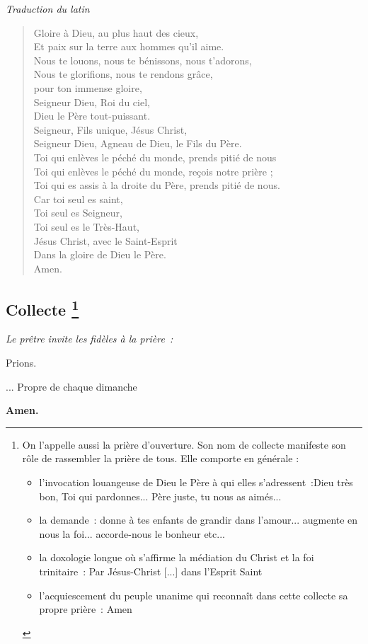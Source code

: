 \emph{Traduction du latin}
\begin{verse}
Gloire à Dieu, au plus haut des cieux, \\
Et paix sur la terre aux hommes qu'il aime.\\
Nous te louons, nous te bénissons, nous t'adorons,\\
Nous te glorifions, nous te rendons grâce,\\
pour ton immense gloire,\\
Seigneur Dieu, Roi du ciel,\\
Dieu le Père tout-puissant.\\
Seigneur, Fils unique, Jésus Christ,\\
Seigneur Dieu, Agneau de Dieu, le Fils du Père.\\
Toi qui enlèves le péché du monde, prends pitié de nous\\
Toi qui enlèves le péché du monde, reçois notre prière ;\\
Toi qui es assis à la droite du Père, prends pitié de nous.\\
Car toi seul es saint,\\
Toi seul es Seigneur,\\
Toi seul es le Très-Haut,\\
Jésus Christ, avec le Saint-Esprit\\
Dans la gloire de Dieu le Père. \\
Amen.\\
\end{verse}



\subsection*{Collecte
  \footnote{On l'appelle aussi la prière d’ouverture. 
    Son nom de collecte manifeste son rôle de rassembler la prière de tous. 
    Elle comporte en générale : 
    \begin{itemize}
      \item l'invocation louangeuse de Dieu le Père à qui elles s'adressent~:Dieu très bon, Toi qui pardonnes... Père juste, tu nous as aimés... 
      \item la demande~:  donne à tes enfants de grandir dans l’amour... augmente en nous la foi... accorde-nous le bonheur etc... 
      \item la doxologie longue où s’affirme la médiation du Christ et la foi trinitaire~: Par Jésus-Christ [...] dans l’Esprit Saint 
      \item l’acquiescement du peuple unanime qui reconnaît dans cette collecte sa propre prière~: Amen 
    \end{itemize}
  }}

\emph{Le prêtre invite les fidèles à la prière~:}

Prions.

... Propre de chaque dimanche

{\bf Amen.}


